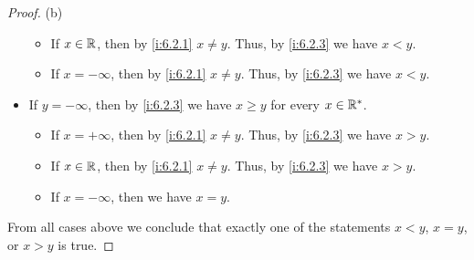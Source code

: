\begin{proof}{(b)}
\begin{itemize}
\begin{itemize}
            \item If \(x \in \mathbb{R}\), then by \cref{i:6.2.1} \(x \neq y\).
                  Thus, by \cref{i:6.2.3} we have \(x < y\).
            \item If \(x = -\infty\), then by \cref{i:6.2.1} \(x \neq y\).
                  Thus, by \cref{i:6.2.3} we have \(x < y\).
          \end{itemize}
    \item If \(y = -\infty\), then by \cref{i:6.2.3} we have \(x \geq y\) for every \(x \in \mathbb{R}^*\).
          \begin{itemize}
            \item If \(x = +\infty\), then by \cref{i:6.2.1} \(x \neq y\).
                  Thus, by \cref{i:6.2.3} we have \(x > y\).
            \item If \(x \in \mathbb{R}\), then by \cref{i:6.2.1} \(x \neq y\).
                  Thus, by \cref{i:6.2.3} we have \(x > y\).
            \item If \(x = -\infty\), then we have \(x = y\).
          \end{itemize}
  \end{itemize}
  From all cases above we conclude that exactly one of the statements \(x < y\), \(x = y\), or \(x > y\) is true.
\end{proof}

